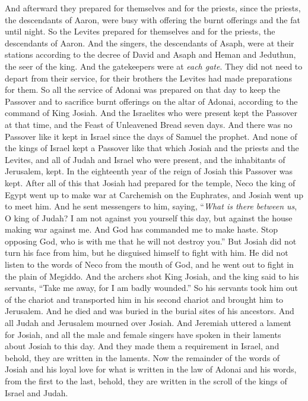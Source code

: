 \begin{biblechapter}
\verse And afterward they prepared for themselves and for the priests, since the priests, the descendants of Aaron, were busy with offering the burnt offerings and the fat until night. So the Levites prepared for themselves and for the priests, the descendants of Aaron.
\verse And the singers, the descendants of Asaph, were at their stations according to the decree of David and Asaph and Heman and Jeduthun, the seer of the king. And the gatekeepers were at \textit{each gate}. They did not need to depart from their service, for their brothers the Levites had made preparations for them.
\verse So all the service of Adonai was prepared on that day to keep the Passover and to sacrifice burnt offerings on the altar of Adonai, according to the command of King Josiah.
\verse And the Israelites who were present kept the Passover at that time, and the Feast of Unleavened Bread seven days.
\verse And there was no Passover like it kept in Israel since the days of Samuel the prophet. And none of the kings of Israel kept a Passover like that which Josiah and the priests and the Levites, and all of Judah and Israel who were present, and the inhabitants of Jerusalem, kept.
\verse In the eighteenth year of the reign of Josiah this Passover was kept.
 After all of this that Josiah had prepared for the temple, Neco the king of Egypt went up to make war at Carchemish on the Euphrates, and Josiah went up to meet him.
\verse And he sent messengers to him, saying, “\textit{What is there between us}, O king of Judah? I am not against you yourself this day, but against the house making war against me. And God has commanded me to make haste. Stop opposing God, who is with me that he will not destroy you.”
\verse But Josiah did not turn his face from him, but he disguised himself to fight with him. He did not listen to the words of Neco from the mouth of God, and he went out to fight in the plain of Megiddo.
\verse And the archers shot King Josiah, and the king said to his servants, “Take me away, for I am badly wounded.”
\verse So his servants took him out of the chariot and transported him in his second chariot and brought him to Jerusalem. And he died and was buried in the burial sites of his ancestors. And all Judah and Jerusalem mourned over Josiah.
\verse And Jeremiah uttered a lament for Josiah, and all the male and female singers have spoken in their laments about Josiah to this day. And they made them a requirement in Israel, and behold, they are written in the laments.
\verse Now the remainder of the words of Josiah and his loyal love for what is written in the law of Adonai
\verse and his words, from the first to the last, behold, they are written in the scroll of the kings of Israel and Judah.
\end{biblechapter}

